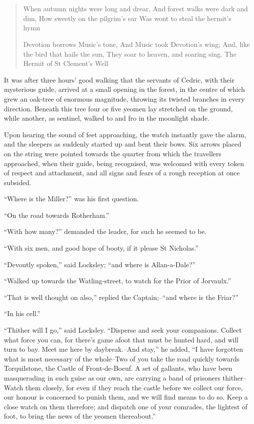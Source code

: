 \chapter{}

\begin{quote}
When autumn nights were long and drear,
And forest walks were dark and dim,
How sweetly on the pilgrim's ear
Was wont to steal the hermit's hymn

Devotion borrows Music's tone,
And Music took Devotion's wing;
And, like the bird that hails the sun,
They soar to heaven, and soaring sing.
The Hermit of St Clement's Well
\end{quote}

It was after three hours' good walking that the servants of Cedric, with
their mysterious guide, arrived at a small opening in the forest, in the
centre of which grew an oak-tree of enormous magnitude, throwing its
twisted branches in every direction. Beneath this tree four or five
yeomen lay stretched on the ground, while another, as sentinel, walked
to and fro in the moonlight shade.

Upon hearing the sound of feet approaching, the watch instantly gave the
alarm, and the sleepers as suddenly started up and bent their bows. Six
arrows placed on the string were pointed towards the quarter from which
the travellers approached, when their guide, being recognised, was
welcomed with every token of respect and attachment, and all signs and
fears of a rough reception at once subsided.

``Where is the Miller?'' was his first question.

``On the road towards Rotherham.''

``With how many?'' demanded the leader, for such he seemed to be.

``With six men, and good hope of booty, if it please St Nicholas.''

``Devoutly spoken,'' said Locksley; ``and where is Allan-a-Dale?''

``Walked up towards the Watling-street, to watch for the Prior of
Jorvaulx.''

``That is well thought on also,'' replied the Captain;--``and where is
the Friar?''

``In his cell.''

``Thither will I go,'' said Locksley. ``Disperse and seek your
companions. Collect what force you can, for there's game afoot that must
be hunted hard, and will turn to bay. Meet me here by daybreak.--And
stay,'' he added, ``I have forgotten what is most necessary of the
whole--Two of you take the road quickly towards Torquilstone, the Castle
of Front-de-Boeuf. A set of gallants, who have been masquerading in such
guise as our own, are carrying a band of prisoners thither--Watch them
closely, for even if they reach the castle before we collect our force,
our honour is concerned to punish them, and we will find means to do so.
Keep a close watch on them therefore; and dispatch one of your comrades,
the lightest of foot, to bring the news of the yeomen thereabout.''

